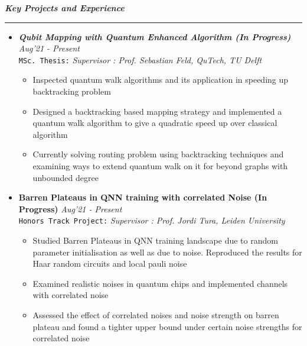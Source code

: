 \documentclass[11pt,a4paper]{article}
\begin{document}
\color{myBlue}
\vspace{0.2cm}
\noindent \Large\textbf{\textit{Key Projects and Experience}} \vspace{0.15cm} \normalsize
\color{gray} \hrule
\color{black}
\begin{itemize}
    \item \textbf{\textit{Qubit Mapping with Quantum Enhanced Algorithm (In Progress)}} \hfill \textit{Aug'21 - Present}\\
    \texttt{MSc. Thesis:} \textit{Supervisor : Prof. Sebastian Feld, QuTech, TU Delft}
    \begin{itemize}
        \item Inspected quantum walk algorithms and its application in speeding up backtracking problem
        \item Designed a backtracking based mapping strategy and implemented a quantum walk algorithm to give a quadratic speed up over classical algorithm
        \item Currently solving routing problem using backtracking techniques and examining ways to extend quantum walk on it for beyond graphs with unbounded degree
    \end{itemize}
    \item \textbf{Barren Plateaus in QNN training with correlated Noise (In Progress)} \hfill \textit{Aug'21 - Present} \\
    \texttt{Honors Track Project:} \textit{Supervisor : Prof. Jordi Tura, Leiden University}
    \begin{itemize}
        \item Studied Barren Plateaus in QNN training landscape due to random parameter initialisation as well as due to noise. Reproduced the results for Haar random circuits and local pauli noise
        \item Examined realistic noises in quantum chips and implemented channels with correlated noise
        \item Assessed the effect of correlated noises and noise strength on barren plateau and found a tighter upper bound under certain noise strengths for correlated noise
    \end{itemize}


\end{itemize}
\end{document}
